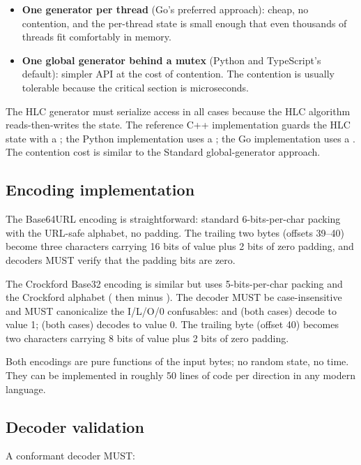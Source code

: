 \begin{itemize}
  \item \textbf{One generator per thread} (Go's preferred approach): cheap, no contention, and the per-thread state is small enough that even thousands of threads fit comfortably in memory.
  \item \textbf{One global generator behind a mutex} (Python and TypeScript's default): simpler API at the cost of contention. The contention is usually tolerable because the critical section is microseconds.
\end{itemize}

The HLC generator must serialize access in all cases because the HLC algorithm reads-then-writes the  state. The reference C++ implementation guards the HLC state with a ; the Python implementation uses a ; the Go implementation uses a . The contention cost is similar to the Standard global-generator approach.

\subsection{Encoding implementation}

The Base64URL encoding is straightforward: standard 6-bits-per-char packing with the URL-safe alphabet, no padding. The trailing two bytes (offsets 39--40) become three characters carrying 16 bits of value plus 2 bits of zero padding, and decoders MUST verify that the padding bits are zero.

The Crockford Base32 encoding is similar but uses 5-bits-per-char packing and the Crockford alphabet ( then  minus ). The decoder MUST be case-insensitive and MUST canonicalize the I/L/O/0 confusables:  and  (both cases) decode to value 1;  (both cases) decodes to value 0. The trailing byte (offset 40) becomes two characters carrying 8 bits of value plus 2 bits of zero padding.

Both encodings are pure functions of the input bytes; no random state, no time. They can be implemented in roughly 50 lines of code per direction in any modern language.

\subsection{Decoder validation}

A conformant decoder MUST:

